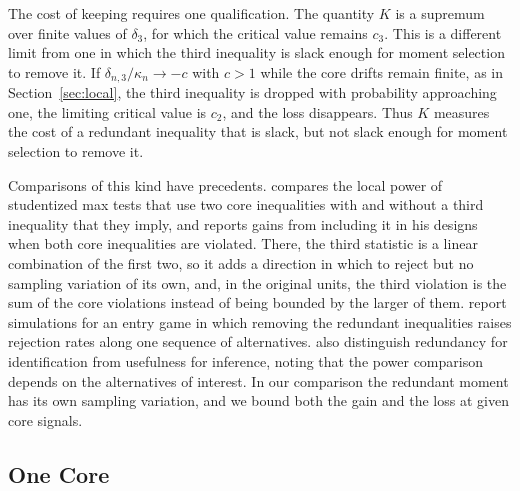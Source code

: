 \documentclass[11pt]{article}
\numberwithin{equation}{section}
\theoremstyle{definition}
\begin{document}
The cost of keeping requires one qualification. The quantity $K$ is a supremum over finite values of $\delta_3$, for which the critical value remains $c_3$. This is a different limit from one in which the third inequality is slack enough for moment selection to remove it. If $\delta_{n,3}/\kappa_n\to-c$ with $c>1$ while the core drifts remain finite, as in Section~\ref{sec:local}, the third inequality is dropped with probability approaching one, the limiting critical value is $c_2$, and the loss disappears. Thus $K$ measures the cost of a redundant inequality that is slack, but not slack enough for moment selection to remove it.

Comparisons of this kind have precedents. \citet[Section~2.3.3]{ponomarev:22} compares the local power of studentized max tests that use two core inequalities with and without a third inequality that they imply, and reports gains from including it in his designs when both core inequalities are violated. There, the third statistic is a linear combination of the first two, so it adds a direction in which to reject but no sampling variation of its own, and, in the original units, the third violation is the sum of the core violations instead of being bounded by the larger of them. \citet[Section~5.3]{luo/wang:18} report simulations for an entry game in which removing the redundant inequalities raises rejection rates along one sequence of alternatives. \citet[Section~4.3.1]{luo/ponomarev/wang:26} also distinguish redundancy for identification from usefulness for inference, noting that the power comparison depends on the alternatives of interest. In our comparison the redundant moment has its own sampling variation, and we bound both the gain and the loss at given core signals.

\subsection{One Core}\label{sec:power-one-core}
\end{document}
